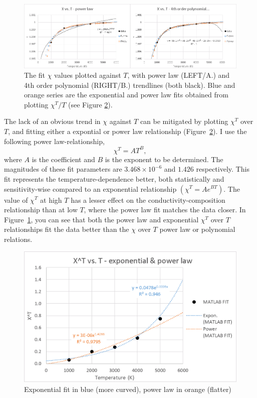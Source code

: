 \begin{figure}[h!]
  \includegraphics[width=\linewidth]{Figures/draft_XT.png}
  \caption[CONTENTS BIT]{The fit $\chi$ values plotted against $T$, with power law (LEFT/A.) and 4th order polynomial (RIGHT/B.) trendlines (both black). Blue and orange series are the exponential and power law fits obtained from plotting $\chi^T/T$ (see Figure \ref{fig:draft_xtt}).}
  \label{fig:draft_xt}
\end{figure}

The lack of an obvious trend in $\chi$ against $T$ can be mitigated by plotting $\chi^T$ over $T$, and fitting either a expontial or power law relationship (Figure~\ref{fig:draft_xtt}). I use the following power law-relationship, 
%
\begin{equation}%
\chi^{T}=A T^{B},
\label{eq.chi_scale}
\end{equation}%
%
where $A$ is the coefficient and $B$ is the exponent to be determined. The magnitudes of these fit parameters are $3.468 \times 10^{-6}$ and $1.426$ respectively. This fit represents the temperature-dependence better, both statistically and sensitivity-wise compared to an exponential relationship $\left ( \chi^{T}=A e^{BT}\right )$. The value of $\chi^T$ at high $T$ has a lesser effect on the conductivity-composition relationship than at low $T$, where the power law fit matches the data closer. In Figure~\ref{fig:draft_xt}, you can see that both the power law and exponential $\chi^T$ over $T$ relationships fit the data better than the $\chi$ over $T$ power law or polynomial relations.

\begin{figure}[h]
  \includegraphics[width=\linewidth]{Figures/draft_XTT.png}
  \caption[CONTENTS BIT]{Exponential fit in blue (more curved), power law in orange (flatter)}
  \label{fig:draft_xtt}
\end{figure}



